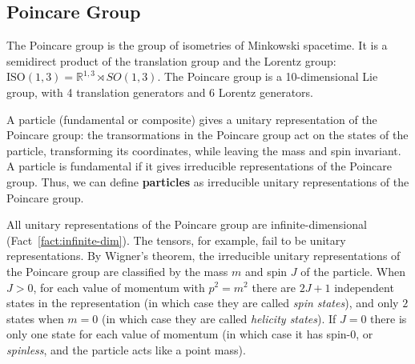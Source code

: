 \subsection{Poincare Group}
\label{subsec:poincare-group}

The Poincare group is the group of isometries of Minkowski spacetime. It is a semidirect product of the translation group and the Lorentz group: $\text{ISO}(1,3) = \mathbb{R}^{1,3} \rtimes SO(1,3)$. The Poincare group is a 10-dimensional Lie group, with 4 translation generators and 6 Lorentz generators.

A particle (fundamental or composite) gives a unitary representation of the Poincare group: the transormations in the Poincare group act on the states of the particle, transforming its coordinates, while leaving the mass and spin invariant. A particle is fundamental if it gives irreducible representations of the Poincare group. Thus, we can define \textbf{particles} as irreducible unitary representations of the Poincare group.

All unitary representations of the Poincare group are infinite-dimensional (Fact~\ref{fact:infinite-dim}). The tensors, for example, fail to be unitary representations.  By Wigner's theorem, the irreducible unitary representations of the Poincare group are classified by the mass $m$ and spin $J$ of the particle. When $J > 0$, for each value of momentum with $p^2 = m^2$ there are $2 J + 1$ independent states in the representation (in which case they are called \textit{spin states}), and only $2$ states when $m = 0$ (in which case they are called \textit{helicity states}). If $J = 0$ there is only one state for each value of momentum (in which case it has spin-$0$, or \textit{spinless}, and the particle acts like a point mass).

